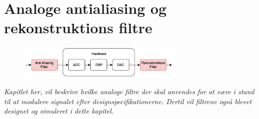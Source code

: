 \chapter{Analoge antialiasing og rekonstruktions filtre}\label{kap:analog_filter}

\begin{figure}[h]
	\vspace*{-1 cm}
	\includegraphics[width=8cm]{billeder/flow_filter}
	\vspace{0.5 cm}
\end{figure}

\emph{Kapitlet her, vil beskrive hvilke analoge filtre der skal anvendes for at være i stand til at modulere signalet efter designspecifikationerne. Dertil vil filtrene også blevet designet og simuleret i dette kapitel.}
